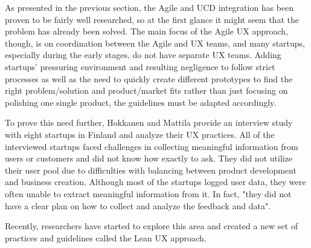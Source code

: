 \documentclass{article}
\begin{document}
As presented in the previous section, the Agile and UCD integration has been proven to be fairly well researched, so at the first glance it might seem that the problem has already been solved. The main focus of the Agile UX approach, though, is on coordination between the Agile and UX teams, and many startups, especially during the early stages, do not have separate UX teams. Adding startups' pressuring environment and resulting negligence to follow strict processes as well as the need to quickly create different prototypes to find the right problem/solution and product/market fits rather than just focusing on polishing one single product, the guidelines must be adapted accordingly.

To prove this need further, Hokkanen and Mattila provide an interview study with eight startups in Finland \citep{hokkanen2015ux} and analyze their UX practices. All of the interviewed startups faced challenges in collecting meaningful information from users or customers and did not know how exactly to ask. They did not utilize their user pool due to difficulties with balancing between product development and business creation. Although most of the startups logged user data, they were often unable to extract meaningful information from it. In fact, "they did not have a clear plan on how to collect and analyze the feedback and data".

Recently, researchers have started to explore this area and created a new set of practices and guidelines called the Lean UX approach.
\end{document}

